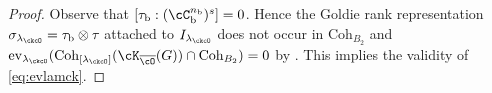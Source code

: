 \documentclass[12pt,a4paper]{amsart}
\newcommand{\CK}{{\mathcal {K}}}
\numberwithin{equation}{section}
\newtheorem{lem}[thm]{Lemma}
\theoremstyle{remark}
\def\lamck{\lambda_\ckcO}
\def\Lamck{[\lambda_\ckcO]}
\def\nbb{n_{\mathrm b}}
\def\Coh{\mathrm{Coh}}
\def\ev#1{{\mathrm{ev}_{#1}}}
\begin{document}
\begin{proof}
  Observe that $[\tau_{\mathrm b}:(\cC_{\mathrm b}^{\nbb})^{s}]=0$. Hence
  the Goldie rank representation $\sigma_{\lamck}
  =\tau_{\mathrm b}\otimes \tau_{\empty}$
  attached to $I_{\lamck}$ does not occur in $\Coh_{B_{2}}$ and $\ev{\lamck}(\Coh_{\Lamck}(\cK_{\bcO}(G))\cap \Coh_{B_{2}}) = 0$ by
  . This implies the validity of \eqref{eq:evlamck}.
\end{proof}




\end{document}
